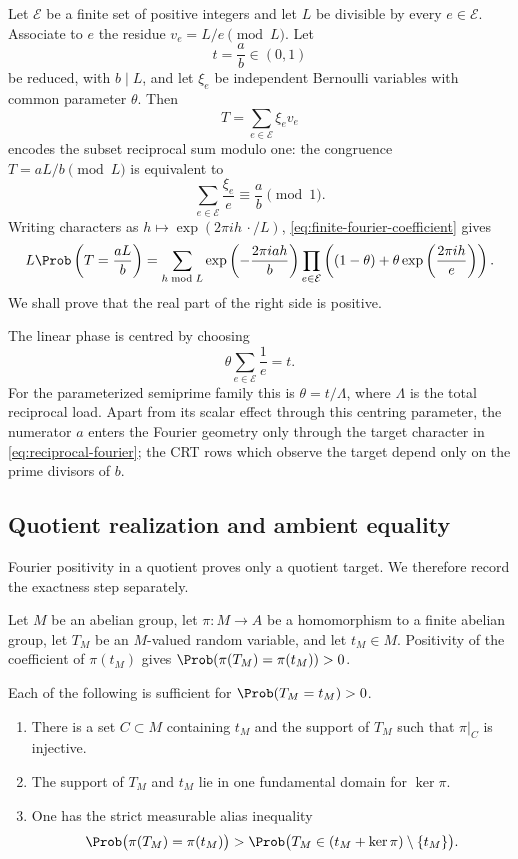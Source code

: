 Let $\mathcal E$ be a finite set of positive integers and let $L$ be divisible by every $e\in\mathcal E$.  Associate to $e$ the residue $v_e=L/e\pmod L$.  Let
\[
 t=\frac ab\in(0,1)
\]
be reduced, with $b\mid L$, and let $\xi_e$ be independent Bernoulli variables with common parameter $\theta$.  Then
\[
 T=\sum_{e\in\mathcal E}\xi_ev_e
\]
encodes the subset reciprocal sum modulo one: the congruence $T=aL/b\pmod L$ is equivalent to
\[
 \sum_{e\in\mathcal E}\frac{\xi_e}{e}\equiv\frac ab\pmod1.
\]
Writing characters as $h\mapsto\exp(2\pi i h\,\cdot/L)$, \cref{eq:finite-fourier-coefficient} gives
\begin{equation}
\label{eq:reciprocal-fourier}
 L\Prob\left(T=\frac{aL}{b}\right)
 =\sum_{h\bmod L}
   \exp\left(-\frac{2\pi i a h}{b}\right)
   \prod_{e\in\mathcal E}
   \left((1-\theta)+\theta\exp\left(\frac{2\pi i h}{e}\right)\right).
\end{equation}
We shall prove that the real part of the right side is positive.

The linear phase is centred by choosing
\begin{equation}
\label{eq:theta-centering}
 \theta\sum_{e\in\mathcal E}\frac1e=t.
\end{equation}
For the parameterized semiprime family this is $\theta=t/\Lambda$, where $\Lambda$ is the total reciprocal load.  Apart from its scalar effect through this centring parameter, the numerator $a$ enters the Fourier geometry only through the target character in \cref{eq:reciprocal-fourier}; the CRT rows which observe the target depend only on the prime divisors of $b$.

\subsection{Quotient realization and ambient equality}

Fourier positivity in a quotient proves only a quotient target.  We therefore record the exactness step separately.

Let $M$ be an abelian group, let $\pi:M\to A$ be a homomorphism to a finite abelian group, let $T_M$ be an $M$-valued random variable, and let $t_M\in M$.  Positivity of the coefficient of $\pi(t_M)$ gives $\Prob(\pi(T_M)=\pi(t_M))>0$.

\begin{proposition}
\label{prop:exactness-interfaces}
Each of the following is sufficient for $\Prob(T_M=t_M)>0$.
\begin{enumerate}[label=(\roman*)]
\item There is a set $C\subset M$ containing $t_M$ and the support of $T_M$ such that $\pi|_C$ is injective.
\item The support of $T_M$ and $t_M$ lie in one fundamental domain for $\ker\pi$.
\item One has the strict measurable alias inequality
\[
 \Prob\bigl(\pi(T_M)=\pi(t_M)\bigr)
 >\Prob\bigl(T_M\in(t_M+\ker\pi)\setminus\{t_M\}\bigr).
\]
\end{enumerate}
\end{proposition}


